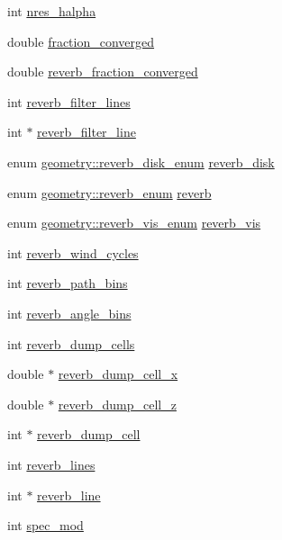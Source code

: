 \begin{DoxyCompactItemize}
int \hyperlink{structgeometry_ae323a0d7e74050d8230c11c22f9e1981}{nres\+\_\+halpha}
\item 
double \hyperlink{structgeometry_a14e36d7ed328d1a6439a8215fa0944a6}{fraction\+\_\+converged}
\item 
double \hyperlink{structgeometry_a38b14c19caa8036cfef9998e80835a57}{reverb\+\_\+fraction\+\_\+converged}
\item 
int \hyperlink{structgeometry_a18f12c75b10603ccb3083536f26cc7a3}{reverb\+\_\+filter\+\_\+lines}
\item 
int $\ast$ \hyperlink{structgeometry_ab6ec9d315491d03aa734835e215aa1ce}{reverb\+\_\+filter\+\_\+line}
\item 
enum \hyperlink{structgeometry_a38a806db00f0535995ab885e461ea7e5}{geometry\+::reverb\+\_\+disk\+\_\+enum} \hyperlink{structgeometry_a2de08061bf054bb010d4e8eaf0403cc9}{reverb\+\_\+disk}
\item 
enum \hyperlink{structgeometry_aa560b242e44807dcdc99ef50ac44edf0}{geometry\+::reverb\+\_\+enum} \hyperlink{structgeometry_a853e273c5a2a6630c2c1c609db0f47a1}{reverb}
\item 
enum \hyperlink{structgeometry_a335f65b5ed9d32c11f5ecd108969dae2}{geometry\+::reverb\+\_\+vis\+\_\+enum} \hyperlink{structgeometry_ad4786d21c40cfe12de994e26895343ad}{reverb\+\_\+vis}
\item 
int \hyperlink{structgeometry_a2cc86681d871e4f85cdf454702748d8c}{reverb\+\_\+wind\+\_\+cycles}
\item 
int \hyperlink{structgeometry_a1d77d068ab2cd8167969ac1058d67b20}{reverb\+\_\+path\+\_\+bins}
\item 
int \hyperlink{structgeometry_aaf5e245df2285bc1ac8295e8f4495aec}{reverb\+\_\+angle\+\_\+bins}
\item 
int \hyperlink{structgeometry_a290e75b63c9e9f1e12d015eef8963058}{reverb\+\_\+dump\+\_\+cells}
\item 
double $\ast$ \hyperlink{structgeometry_a5ab011bdec87ce7b539d1b2ae35cd60e}{reverb\+\_\+dump\+\_\+cell\+\_\+x}
\item 
double $\ast$ \hyperlink{structgeometry_ac3fefd57486f43e08714f9a12c4be63a}{reverb\+\_\+dump\+\_\+cell\+\_\+z}
\item 
int $\ast$ \hyperlink{structgeometry_ada4a723e1738833f0f50ad4a8de7e426}{reverb\+\_\+dump\+\_\+cell}
\item 
int \hyperlink{structgeometry_aa9806a8b1577355dc4c5b1e6e6ec00d4}{reverb\+\_\+lines}
\item 
int $\ast$ \hyperlink{structgeometry_a4cdefc5ea0664d2351f9242d6dc58418}{reverb\+\_\+line}
\item 
int \hyperlink{structgeometry_aa78a12aa790f9ced5186cb492e117374}{spec\+\_\+mod}
\end{DoxyCompactItemize}


